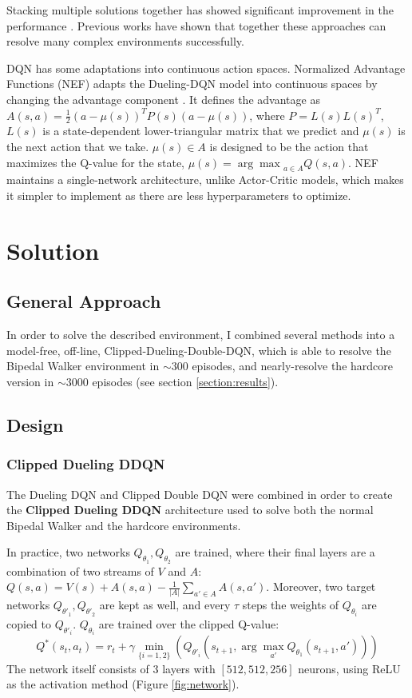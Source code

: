 \documentclass{article}
\begin{document}
\begin{multicols}{2}
Stacking multiple solutions together has showed significant improvement in the performance \cite{Rainbow}. Previous works have shown that together these approaches can resolve many complex environments successfully.

DQN has some adaptations into continuous action spaces. Normalized Advantage Functions (NEF) adapts the Dueling-DQN model into continuous spaces by changing the advantage component \cite{NEF}.
It defines the advantage as $A(s,a) = \frac12 (a-\mu(s))^T P(s) (a - \mu(s))$, where $P=L(s)L(s)^T$, $L(s)$ is a state-dependent lower-triangular matrix that we predict and $\mu(s)$ is the next action that we take. $\mu(s) \in A$ is designed to be the action that maximizes the Q-value for the state, $\mu(s) = {\arg \max}_{a\in A} Q(s,a)$. NEF maintains a single-network architecture, unlike Actor-Critic models, which makes it simpler to implement as there are less hyperparameters to optimize.

\section{Solution}

\subsection{General Approach}
In order to solve the described environment, I combined several methods into a model-free, off-line, Clipped-Dueling-Double-DQN, which is able to resolve the Bipedal Walker environment in $\sim 300$ episodes, and nearly-resolve the hardcore version in $\sim 3000$ episodes (see section \ref{section:results}).


\subsection{Design}
\subsubsection{Clipped Dueling DDQN}
The Dueling DQN and Clipped Double DQN were combined in order to create the \textbf{Clipped Dueling DDQN} architecture used to solve both the normal Bipedal Walker and the hardcore environments.

In practice, two networks $Q_{\theta_1}, Q_{\theta_2}$ are trained, where their final layers are a combination of two streams of $V$ and $A$: $Q(s,a)=V(s)+A(s,a) - \frac1{|A|}\sum_{a'\in A}A(s,a')$. Moreover, two target networks $Q_{\theta'_1}, Q_{\theta'_2}$ are kept as well, and every $\tau$ steps the weights of $Q_{\theta_i}$ are copied to $Q_{\theta'_i}$. $Q_{\theta_i}$ are trained over the clipped Q-value: 
$$Q^*(s_t, a_t) = r_t + \gamma \min_{\{i = 1, 2\}} (Q_{\theta'_i}(s_{t+1}, \arg \max_{a'}Q_{\theta_1}(s_{t+1}, a')))$$
The network itself consists of 3 layers with $[512, 512, 256]$ neurons, using ReLU as the activation method (Figure \ref{fig:network}).


\end{multicols}
\end{document}
